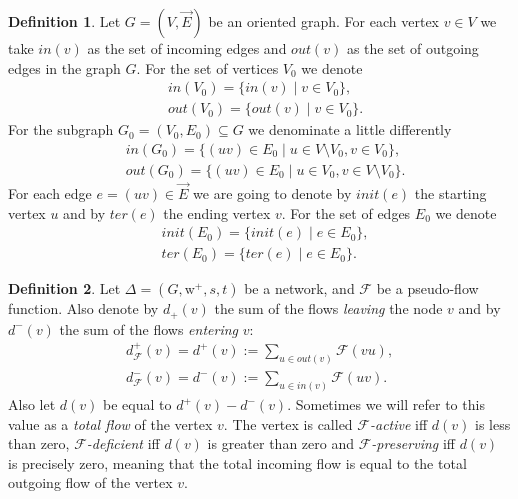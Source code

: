 \documentclass[12pt]{article}
\theoremstyle{definition}
\newtheorem{definition}{Definition}
\newcommand{\wtp}{\mathrm{w}^{+}}
\newcommand{\flow}{\mathcal{F}}
\newcommand{\init}{init}
\newcommand{\ter}{ter}
\newcommand{\ein}{in}
\newcommand{\eout}{out}
\newcommand{\net}{\Delta}
\numberwithin{remark}{section}
\numberwithin{theorem}{section}
\numberwithin{prop}{section}
\numberwithin{equation}{section}
\numberwithin{lemma}{section}
\numberwithin{prop_under_lemma}{lemma}
\begin{document}
    \begin{definition}
      Let $G = (V, \vec{E})$ be an oriented graph.
      For each vertex $v \in V$ we take $\ein(v)$ as the set of incoming edges
      and $\eout(v)$ as the set of outgoing edges in the graph $G$.
      For the set of vertices $V_0$ we denote
      \begin{align*}
        &\ein(V_0) = \big\{\ein(v) \mid v\in V_0\big\},\\
        &\eout(V_0) = \big\{\eout(v) \mid v\in V_0\big\}.
      \end{align*}
      For the subgraph $G_0 = (V_0, E_0) \subseteq G$ we denominate a little differently
      \begin{align*}
        &\ein(G_0) = \big\{(uv)\in E_0 \mid u \in V \setminus V_0, v \in V_0\big\},\\
        &\eout(G_0) = \big\{(uv) \in E_0 \mid u \in V_0, v \in V\setminus V_0\big\}.
      \end{align*}
      For each edge $e=(uv) \in \vec{E}$ we are going to denote by $\init(e)$ the starting vertex
      $u$ and by $\ter(e)$ the ending vertex $v$.
      For the set of edges $E_0$ we denote
      \begin{align*}
        &\init(E_0) = \big\{\init(e) \mid e\in E_0\big\},\\
        &\ter(E_0) = \big\{\ter(e) \mid e\in E_0\big\}.
      \end{align*}
    \end{definition}
    \begin{definition}
      Let $\net = (G, \wtp, s, t)$ be a network, and $\flow$ be a pseudo-flow function.
      Also denote by $d_{+}(v)$ the sum of the flows \emph{leaving} the node $v$ and by
      $d^{-}(v)$ the sum of the flows \emph{entering} $v$:
      \begin{align*}
        d^{+}_{\flow}(v) = d^{+}(v) := \sum_{u \in \eout(v)} \flow(vu),\\
        d^{-}_{\flow}(v) = d^{-}(v) := \sum_{u \in \ein(v)} \flow(uv).
      \end{align*}
      Also let $d(v)$ be equal to $d^{+}(v) - d^{-}(v)$. Sometimes we will refer to this value as
      a \emph{total flow} of the vertex $v$.
      The vertex is called \emph{$\flow$-active} iff $d(v)$ is less than zero,
      \emph{$\flow$-deficient} iff $d(v)$ is greater than zero and
      \emph{$\flow$-preserving} iff $d(v)$ is precisely zero, meaning that the total incoming flow
      is equal to the total outgoing flow of the vertex $v$.
    \end{definition}
\end{document}
